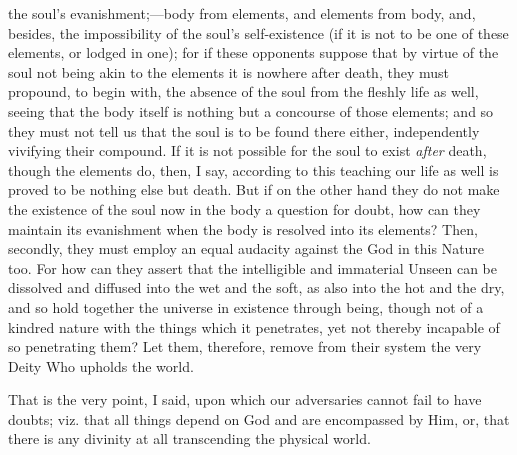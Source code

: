 the soul’s evanishment;—body from elements, and elements from body, and, besides, the impossibility of the soul’s self-existence (if it is not to be one of these elements, or lodged in one); for if these opponents suppose that by virtue of the soul not being akin to the elements it is nowhere after death, they must propound, to begin with, the absence of the soul from the fleshly life as well, seeing that the body itself is nothing but a concourse of those elements; and so they must not tell us that the soul is to be found there either, independently vivifying their compound. If it is not possible for the soul to exist \emph{after} death, though the elements do, then, I say, according to this teaching our life as well is proved to be nothing else but death. But if on the other hand they do not make the existence of the soul now in the body a question for doubt, how can they maintain its evanishment when the body is resolved into its elements? Then, secondly, they must employ an equal audacity against the God in this Nature too. For how can they assert that the intelligible and immaterial Unseen can be dissolved and diffused into the wet and the soft, as also into the hot and the dry, and so hold together the universe in existence through being, though not of a kindred nature with the things which it penetrates, yet not thereby incapable of so penetrating them? Let them, therefore, remove from their system the very Deity Who upholds the world.

That is the very point, I said, upon which our adversaries cannot fail to have doubts; viz. that all things depend on God and are encompassed by Him, or, that there is any divinity at all transcending the physical world.

